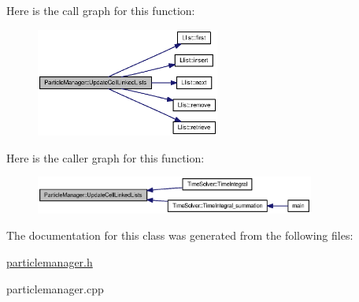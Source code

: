 Here is the call graph for this function:\nopagebreak
\begin{figure}[H]
\begin{center}
\leavevmode
\includegraphics[width=171pt]{classParticleManager_740244439672f753735abc5a6a7cc3bc_cgraph}
\end{center}
\end{figure}


Here is the caller graph for this function:\nopagebreak
\begin{figure}[H]
\begin{center}
\leavevmode
\includegraphics[width=260pt]{classParticleManager_740244439672f753735abc5a6a7cc3bc_icgraph}
\end{center}
\end{figure}


The documentation for this class was generated from the following files:\begin{CompactItemize}
\item 
\hyperlink{particlemanager_8h}{particlemanager.h}\item 
particlemanager.cpp\end{CompactItemize}
